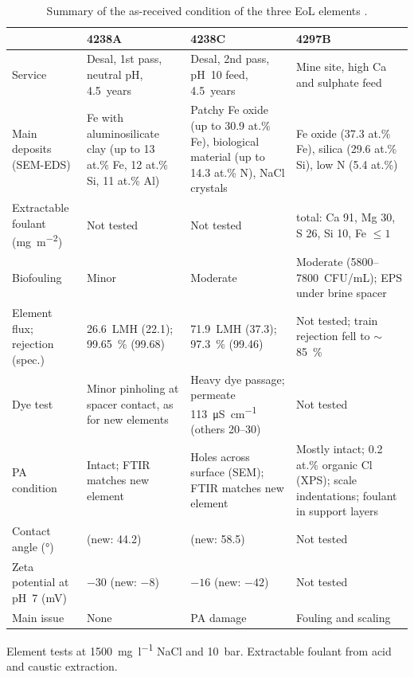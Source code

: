 \begin{table}[htbp]
  \centering
  \caption{Summary of the as-received condition of the three EoL elements \citep{MembraneWorks2025Desal,MembraneWorks2026Mine}.}
  \label{tab:eol-summary}
  \small
  \begin{tabularx}{\textwidth}{@{}>{\raggedright\arraybackslash}p{}*{3}{>{\raggedright\arraybackslash}X}@{}}
    \toprule
    & \textbf{4238A} & \textbf{4238C} & \textbf{4297B} \\
    \midrule
    Service & Desal, 1st pass, neutral pH, 4.5~years
            & Desal, 2nd pass, pH~10 feed, 4.5~years
            & Mine site, high Ca and sulphate feed \\
    \addlinespace
    Main deposits (SEM-EDS) & Fe with aluminosilicate clay (up to 13 at.\% Fe, 12 at.\% Si, 11 at.\% Al)
            & Patchy Fe oxide (up to 30.9 at.\% Fe), biological material (up to 14.3 at.\% N), NaCl crystals
            & Fe oxide (37.3 at.\% Fe), silica (29.6 at.\% Si), low N (5.4 at.\%) \\
    \addlinespace
    Extractable foulant (\unit{mg.m^{-2}}) & Not tested & Not tested
            & 237.5 total: Ca 91, Mg 30, S 26, Si 10, Fe $\leq 1$ \\
    \addlinespace
    Biofouling & Minor & Moderate
            & Moderate (5800--7800~CFU/mL); EPS under brine spacer \\
    \addlinespace
    Element flux; rejection (spec.) & \qty{26.6}{LMH} (22.1); \qty{99.65}{\percent} (99.68)
            & \qty{71.9}{LMH} (37.3); \qty{97.3}{\percent} (99.46)
            & Not tested; train rejection fell to $\sim$\qty{85}{\percent} \\
    \addlinespace
    Dye test & Minor pinholing at spacer contact, as for new elements
            & Heavy dye passage; permeate \qty{113}{\micro\siemens\per\centi\metre} (others 20--30)
            & Not tested \\
    \addlinespace
    PA condition & Intact; FTIR matches new element
            & Holes across surface (SEM); FTIR matches new element
            & Mostly intact; 0.2 at.\% organic Cl (XPS); scale indentations; foulant in support layers \\
    \addlinespace
    Contact angle (\unit{\degree}) & 25.1 (new: 44.2) & 34.5 (new: 58.5) & Not tested \\
    \addlinespace
    Zeta potential at pH~7 (\unit{mV}) & $-30$ (new: $-8$) & $-16$ (new: $-42$) & Not tested \\
    \addlinespace
    Main issue & None & PA damage & Fouling and scaling \\
    \bottomrule
  \end{tabularx}
  \par\smallskip
  \footnotesize Element tests at \qty{1500}{\milli\gram\per\litre} NaCl and \qty{10}{bar}. Extractable foulant from acid and caustic extraction.
\end{table}


